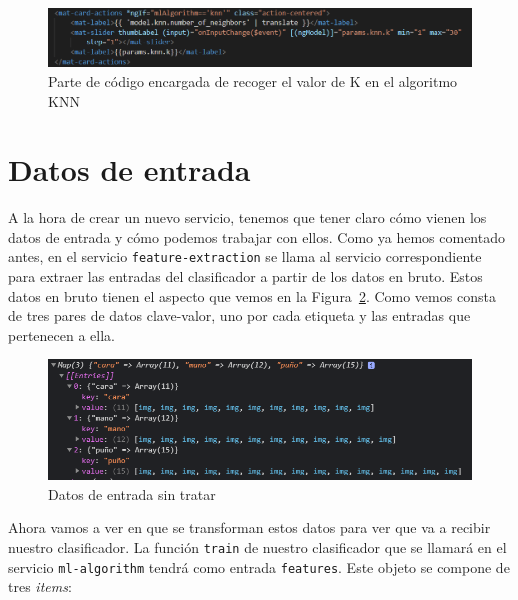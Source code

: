 \documentclass[a4paper, 12pt]{book}
\begin{document}
\begin{figure}
	\centering
	\includegraphics[width=12cm, keepaspectratio]{img/nvecinosknn}
	\caption{Parte de código encargada de recoger el valor de K en el algoritmo KNN}				
     \label{fig:nvecinosknn}
\end{figure}

\section{Datos de entrada} 
\label{sec:datosdeentrada}

A la hora de crear un nuevo servicio, tenemos que tener claro cómo vienen los datos de entrada y cómo podemos trabajar con ellos. Como ya hemos comentado antes, en el servicio \texttt{feature-extraction} se llama al servicio correspondiente para extraer las entradas del clasificador a partir de los datos en bruto. Estos datos en bruto tienen el aspecto que vemos en la Figura~\ref{fig:datosenbruto}. Como vemos consta de tres pares de datos clave-valor, uno por cada etiqueta y las entradas que pertenecen a ella.

\begin{figure}
	\centering
	\includegraphics[width=12cm, keepaspectratio]{img/datosenbruto}
	\caption{Datos de entrada sin tratar}				
	\label{fig:datosenbruto}
\end{figure}

Ahora vamos a ver en que se transforman estos datos para ver que va a recibir nuestro clasificador. La función \texttt{train} de nuestro clasificador que se llamará en el servicio \texttt{ml-algorithm} tendrá como entrada \texttt{features}. Este objeto se compone de tres \emph{items}:
\end{document}
